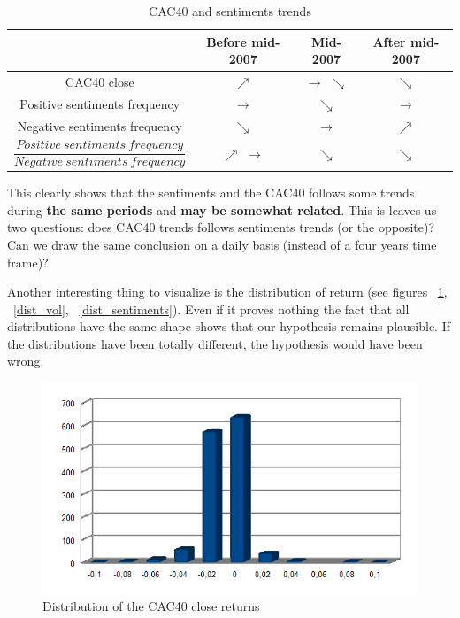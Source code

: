 \documentclass[12pt]{report}
\begin{document}
			\begin{center}
			\begin{table}
			\begin{tabular}{|c | c | c | c|}
				\hline
				& Before mid-2007 & Mid-2007 & After mid-2007\\
				\hline
				CAC40 close & $\nearrow$ & $\rightarrow$ $\searrow$ & $\searrow$\\
				\hline
				Positive sentiments frequency & $\rightarrow$ & $\searrow$ & $\rightarrow$\\
				\hline
				Negative sentiments frequency & $\searrow$ & $\rightarrow$ & $\nearrow$\\
				\hline
				$\dfrac{Positive\ sentiments\ frequency}{Negative\ sentiments\ frequency}$ & $\nearrow$ $\rightarrow$ & $\searrow$ & $\searrow$\\
				\hline
			\end{tabular}
			\caption{CAC40 and sentiments trends\label{trends}}
			\end{table}
			\end{center}

			This clearly shows that the sentiments and the CAC40 follows some trends during \textbf{the same periods} and \textbf{may be somewhat related}. This is leaves us two questions: does CAC40 trends follows sentiments trends (or the opposite)? Can we draw the same conclusion on a daily basis (instead of a four years time frame)?

			Another interesting thing to visualize is the distribution of return (see figures ~\ref{dist_cac}, ~\ref{dist_vol}, ~\ref{dist_sentiments}). Even if it proves nothing the fact that all distributions have the same shape shows that our hypothesis remains plausible. If the distributions have been totally different, the hypothesis would have been wrong.

			\begin{figure}[H]
				\caption{Distribution of the CAC40 close returns\label{dist_cac}}
				\includegraphics{plots/dists/close_return.png}
			\end{figure}
\end{document}

